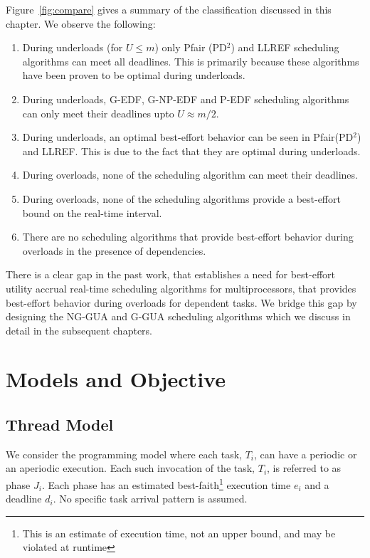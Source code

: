 \documentclass[12pt,dvips]{report}
\begin{document}
Figure~\ref{fig:compare} gives a summary of the classification discussed in this chapter. We observe the following:
\begin{enumerate}
	\item During underloads (for $U \le m$) only Pfair (PD$^2$) and LLREF scheduling algorithms can meet all deadlines. This is primarily because these algorithms have been proven to be optimal during underloads.
	\item During underloads, G-EDF, G-NP-EDF and P-EDF scheduling algorithms can only meet their deadlines upto $U \approx m/2$.
	\item During underloads, an optimal best-effort behavior can be seen in Pfair(PD$^2$) and LLREF. This is due to the fact that they are optimal during underloads.
	\item During overloads, none of the scheduling algorithm can meet their deadlines.
	\item During overloads, none of the scheduling algorithms provide a best-effort bound on the real-time interval.
	\item There are no scheduling algorithms that provide best-effort behavior during overloads in the presence of dependencies.
\end{enumerate}

There is a clear gap in the past work, that establishes a need for best-effort utility accrual real-time scheduling algorithms for multiprocessors, that provides best-effort behavior during overloads for dependent tasks. We bridge this gap by designing the NG-GUA and G-GUA scheduling algorithms which we discuss in detail in the subsequent chapters.


\chapter{Models and Objective}\label{chap:models-and-objective}

\section{Thread Model}
We consider the programming model where each task, $T_i$, can have a periodic or an aperiodic execution. Each such invocation of the task, $T_i$, is referred to as phase $J_i$. Each phase has an estimated best-faith\footnote{This is an estimate of execution time, not an upper bound, and may be violated at runtime} execution time $e_i$ and a deadline $d_i$. No specific task arrival pattern is assumed.
\end{document}
